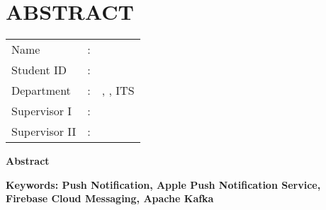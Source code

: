 \chapter {ABSTRACT}
\noindent\textbf{\MakeUppercase\juduleng}
\vspace*{1em}

\begin{tabularx}{\linewidth}{ l l X }
	Name 			& : & \penulis \\
	Student ID		& :	& \nrp \\
	Department 		& : & \jurusaneng, \newline \fakultaseng, ITS \\
	Supervisor I 	& : & \pembimbingsatu \\
	Supervisor II 	& : & \pembimbingdua
	\vspace*{1em} 	%
\end {tabularx}
	
\noindent\textbf{Abstract} \\
\itshape
\par 

\vspace*{1em}
\noindent\bfseries Keywords: Push Notification, Apple Push Notification Service, Firebase Cloud Messaging, Apache Kafka
\normalfont
\cleardoublepage